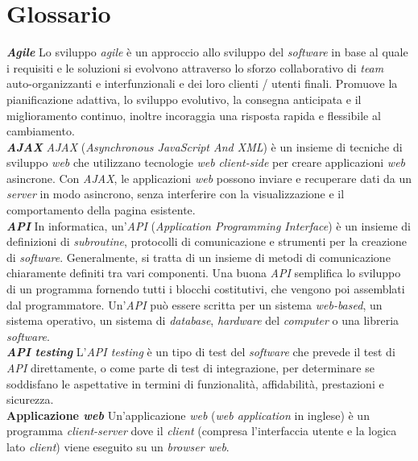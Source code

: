 \chapter{Glossario} \label{gloss}


\hspace{15pt}\textbf{\textit{Agile}} Lo sviluppo \textit{agile} è un approccio allo sviluppo del \textit{software} in base al quale i requisiti e le soluzioni si evolvono attraverso lo sforzo collaborativo di \textit{team} auto-organizzanti e interfunzionali e dei loro clienti / utenti finali. Promuove la pianificazione adattiva, lo sviluppo evolutivo, la consegna anticipata e il miglioramento continuo, inoltre incoraggia una risposta rapida e flessibile al cambiamento.\\

\textbf{\textit{AJAX}} \textit{AJAX} (\textit{Asynchronous JavaScript And XML}) è un insieme di tecniche di sviluppo \textit{web} che utilizzano tecnologie \textit{web} \textit{client-side} per creare applicazioni \textit{web} asincrone. Con \textit{AJAX}, le applicazioni \textit{web} possono inviare e recuperare dati da un \textit{server} in modo asincrono, senza interferire con la visualizzazione e il comportamento della pagina esistente.\\

\textbf{\textit{API}} In informatica, un'\textit{API} (\textit{Application Programming Interface}) è un insieme di definizioni di \textit{subroutine}, protocolli di comunicazione e strumenti per la creazione di \textit{software}. Generalmente, si tratta di un insieme di metodi di comunicazione chiaramente definiti tra vari componenti. Una buona \textit{API} semplifica lo sviluppo di un programma fornendo tutti i blocchi costitutivi, che vengono poi assemblati dal programmatore. Un'\textit{API} può essere scritta per un sistema \textit{web-based}, un sistema operativo, un sistema di \textit{database}, \textit{hardware} del \textit{computer} o una libreria \textit{software}.\\

\textbf{\textit{API testing}} L'\textit{API testing} è un tipo di test del \textit{software} che prevede il test di \textit{API} direttamente, o come parte di test di integrazione, per determinare se soddisfano le aspettative in termini di funzionalità, affidabilità, prestazioni e sicurezza.\\

\textbf{Applicazione \textit{web}} Un'applicazione \textit{web} (\textit{web application} in inglese) è un programma \textit{client-server} dove il \textit{client} (compresa l'interfaccia utente e la logica lato \textit{client}) viene eseguito su un \textit{browser web}.\\


